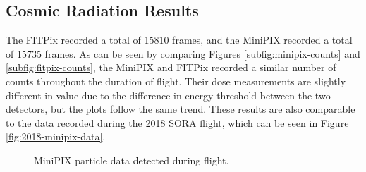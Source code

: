 \subsection{Cosmic Radiation Results}
\label{sec:Cosmic-Radiation-Results}

The FITPix recorded a total of 15810 frames, and the MiniPIX recorded a total of 15735 frames.
As can be seen by comparing Figures \ref{subfig:minipix-counts} and \ref{subfig:fitpix-counts}, the MiniPIX and FITPix recorded a similar number of counts throughout the duration of flight.
Their dose measurements are slightly different in value due to the difference in energy threshold between the two detectors, but the plots follow the same trend.
These results are also comparable to the data recorded during the 2018 SORA flight, which can be seen in Figure \ref{fig:2018-minipix-data}.

\begin{figure}[h!]
\hfill
{}
\hfill
{}
\hfill
\caption{MiniPIX particle data detected during flight.}
\label{fig:minipix-data}
\end{figure}

